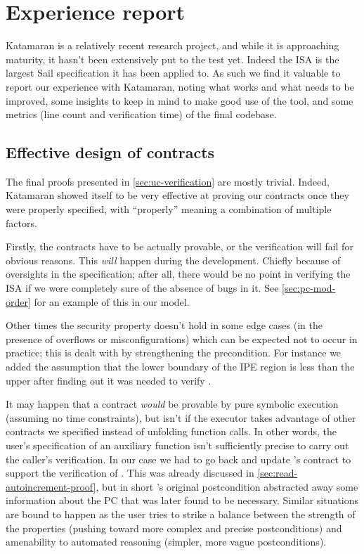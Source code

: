 \chapter{Experience report}
\label{ch:evaluation}

Katamaran is a relatively recent research project, and while it is approaching maturity, it hasn't been extensively put to the test yet. Indeed the \msp ISA is the largest Sail specification it has been applied to. As such we find it valuable to report our experience with Katamaran, noting what works and what needs to be improved, some insights to keep in mind to make good use of the tool, and some metrics (line count and verification time) of the final codebase.

\section{Effective design of contracts}

The final proofs presented in \cref{sec:uc-verification} are mostly trivial. Indeed, Katamaran showed itself to be very effective at proving our contracts once they were properly specified, with ``properly'' meaning a combination of multiple factors.

Firstly, the contracts have to be actually provable, or the verification will fail for obvious reasons. This \emph{will} happen during the development. Chiefly because of oversights in the specification; after all, there would be no point in verifying the ISA if we were completely sure of the absence of bugs in it. See \cref{sec:pc-mod-order} for an example of this in our \msp model.

Other times the security property doesn't hold in some edge cases (\eg in the presence of overflows or misconfigurations) which can be expected not to occur in practice; this is dealt with by strengthening the precondition. For instance we added the assumption that the lower boundary of the IPE region is less than the upper after finding out it was needed to verify .

It may happen that a contract \emph{would} be provable by pure symbolic execution (assuming no time constraints), but isn't if the executor takes advantage of other contracts we specified instead of unfolding function calls. In other words, the user's specification of an auxiliary function isn't sufficiently precise to carry out the caller's verification. In our case we had to go back and update 's contract to support the verification of . This was already discussed in \cref{sec:read-autoincrement-proof}, but in short 's original postcondition abstracted away some information about the PC that was later found to be necessary. Similar situations are bound to happen as the user tries to strike a balance between the strength of the properties (pushing \eg toward more complex and precise postconditions) and amenability to automated reasoning (simpler, more vague postconditions).

